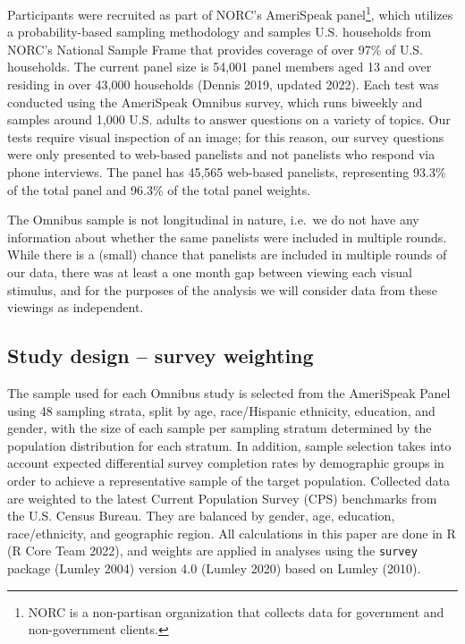 \documentclass[
]{jds}
\begin{document}
Participants were recruited as part of NORC's AmeriSpeak
panel\footnote{NORC is a non-partisan organization that collects data
  for government and non-government clients.}, which utilizes a
probability-based sampling methodology and samples U.S. households from
NORC's National Sample Frame that provides coverage of over 97\% of U.S.
households. The current panel size is 54,001 panel members aged 13 and
over residing in over 43,000 households (Dennis 2019, updated 2022).
Each test was conducted using the AmeriSpeak Omnibus survey, which runs
biweekly and samples around 1,000 U.S. adults to answer questions on a
variety of topics. Our tests require visual inspection of an image; for
this reason, our survey questions were only presented to web-based
panelists and not panelists who respond via phone interviews. The panel
has 45,565 web-based panelists, representing 93.3\% of the total panel
and 96.3\% of the total panel weights.

The Omnibus sample is not longitudinal in nature, i.e.~we do not have
any information about whether the same panelists were included in
multiple rounds. While there is a (small) chance that panelists are
included in multiple rounds of our data, there was at least a one month
gap between viewing each visual stimulus, and for the purposes of the
analysis we will consider data from these viewings as independent.

\hypertarget{study-design-survey-weighting}{%
\subsection{Study design -- survey
weighting}\label{study-design-survey-weighting}}

The sample used for each Omnibus study is selected from the AmeriSpeak
Panel using 48 sampling strata, split by age, race/Hispanic ethnicity,
education, and gender, with the size of each sample per sampling stratum
determined by the population distribution for each stratum. In addition,
sample selection takes into account expected differential survey
completion rates by demographic groups in order to achieve a
representative sample of the target population. Collected data are
weighted to the latest Current Population Survey (CPS) benchmarks from
the U.S. Census Bureau. They are balanced by gender, age, education,
race/ethnicity, and geographic region. All calculations in this paper
are done in R (R Core Team 2022), and weights are applied in analyses
using the \texttt{survey} package (Lumley 2004) version 4.0 (Lumley
2020) based on Lumley (2010).
\end{document}
